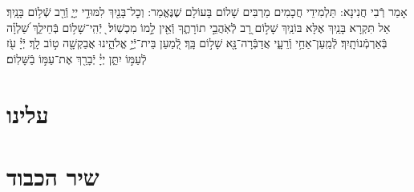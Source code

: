 \documentclass[twoside, openany, parskip=half, 11pt]{book}
\begin{document}
\vspace{-.3\baselineskip}
אָמַר רְֿבִי חֲנִינָא: תַּלְמִידֵי חֲכָמִים מַרְבִּים שָׁלוֹם בָּעוֹלָם שֶׁנֶּאֱמַר: וְכׇל־בָּנַ֖יִךְ לִמּוּדֵ֣י יְיָ֑ וְֿרַ֖ב שְֿׁל֥וֹם בָּנָֽיִךְ׃ אַל תִּקְרָא בָּנַֽיִךְ אֶלָּא בּוֹנַֽיִךְ שָׁל֣וֹם רָ֭ב לְֿאֹֽהֲבֵ֣י תוֹרָתֶ֑ךָ וְֿאֵ֖ין לָ֣מוֹ מִכְשֽׁוֹל׃  ֖ יְֿהִֽי־שָׁל֥וֹם בְּֿחֵילֵ֑ךְ שַׁ֝לְוָ֗ה בְּֿאַרְמְֿנוֹתָֽיִךְ׃ לְֿמַֽעַן־אַחַ֥י וְֿרֵעָ֑י אֲדַבְּֿרָה־נָּ֖א שָׁל֣וֹם בָּֽךְ׃ לְֿ֭מַעַן בֵּית־יְֿיָ֣ אֱלֹהֵ֑ינוּ אֲבַקְשָׁ֖ה ט֣וֹב לָֽךְ׃ יְֿיָ֗ עֹ֖ז לְֿעַמּ֣וֹ יִתֵּ֑ן יְיָ֓ יְֿבָרֵ֖ךְ אֶת־עַמּ֣וֹ בַֿשָּׁלֽוֹם׃

\mournerskaddish

\section*{ עלינו }

\aleinu



\clearpage

\vspace{-1\baselineskip}
\section*{ שיר הכבוד }
\label{shir_shel_shabbos}
\end{document}
